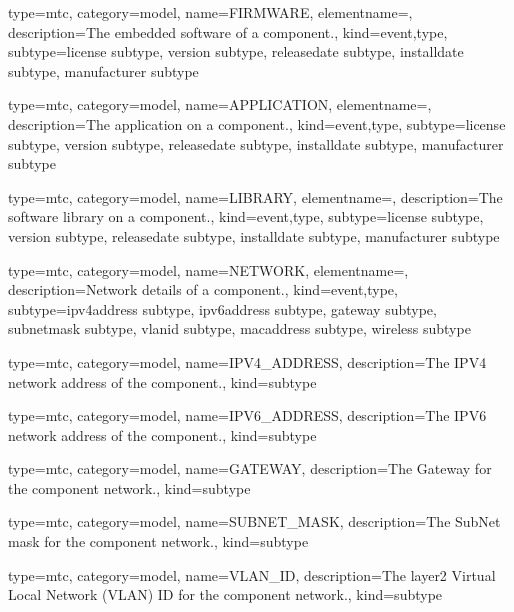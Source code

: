 {
  type=mtc,
  category=model,
  name={FIRMWARE},
  elementname=,
  description={The embedded software of a component.},
  kind={event,type},
  subtype={\gls{license subtype}, \gls{version subtype}, \gls{releasedate subtype}, \gls{installdate subtype}, \gls{manufacturer subtype}}
}


{
  type=mtc,
  category=model,
  name={APPLICATION},
  elementname=,
  description={The application on a component.},
  kind={event,type},
  subtype={\gls{license subtype}, \gls{version subtype}, \gls{releasedate subtype}, \gls{installdate subtype}, \gls{manufacturer subtype}}
}


{
  type=mtc,
  category=model,
  name={LIBRARY},
  elementname=,
  description={The software library on a component.},
  kind={event,type},
  subtype={\gls{license subtype}, \gls{version subtype}, \gls{releasedate subtype}, \gls{installdate subtype}, \gls{manufacturer subtype}}
}


{
  type=mtc,
  category=model,
  name={NETWORK},
  elementname=,
  description={Network details of a component.},
  kind={event,type},
  subtype={\gls{ipv4address subtype}, \gls{ipv6address subtype}, \gls{gateway subtype}, \gls{subnetmask subtype}, \gls{vlanid subtype}, \gls{macaddress subtype}, \gls{wireless subtype}}
}


{
  type=mtc,
  category=model,
  name={IPV4\_ADDRESS},
  description={The IPV4 network address of the component.},
  kind={subtype}
}


{
  type=mtc,
  category=model,
  name={IPV6\_ADDRESS},
  description={The IPV6 network address of the component.},
  kind={subtype}
}


{
  type=mtc,
  category=model,
  name={GATEWAY},
  description={The Gateway for the component network.},
  kind={subtype}
}


{
  type=mtc,
  category=model,
  name={SUBNET\_MASK},
  description={The SubNet mask for the component network.},
  kind={subtype}
}


{
  type=mtc,
  category=model,
  name={VLAN\_ID},
  description={The layer2 Virtual Local Network (VLAN) ID for the component network.},
  kind={subtype}
}


